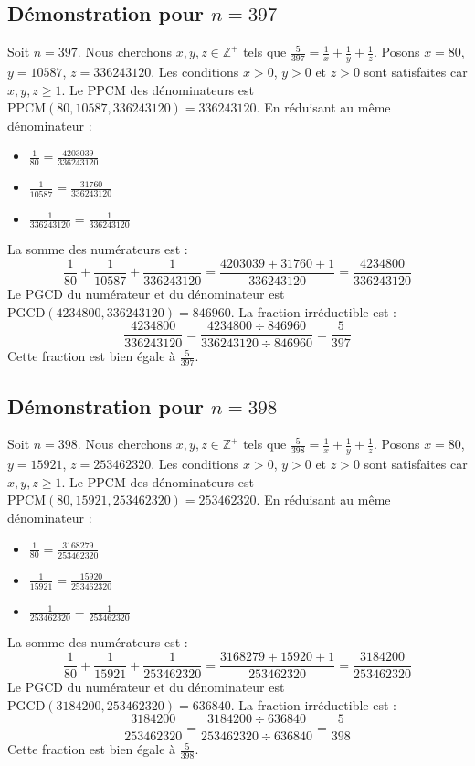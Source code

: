 \documentclass[11pt,a4paper]{article}
\begin{document}
\subsection{Démonstration pour $n = 397$}
Soit $n = 397$. Nous cherchons $x, y, z \in \mathbb{Z}^{+}$ tels que $\frac{5}{397} = \frac{1}{x} + \frac{1}{y} + \frac{1}{z}$.
Posons $x = 80$, $y = 10587$, $z = 336243120$.
Les conditions $x > 0$, $y > 0$ et $z > 0$ sont satisfaites car $x, y, z \geq 1$.
Le PPCM des dénominateurs est $\text{PPCM}(80, 10587, 336243120) = 336243120$.
En réduisant au même dénominateur :
\begin{itemize}
    \item $\frac{1}{80} = \frac{4203039}{336243120}$
    \item $\frac{1}{10587} = \frac{31760}{336243120}$
    \item $\frac{1}{336243120} = \frac{1}{336243120}$
\end{itemize}
La somme des numérateurs est :
$$ \frac{1}{80} + \frac{1}{10587} + \frac{1}{336243120} = \frac{4203039 + 31760 + 1}{336243120} = \frac{4234800}{336243120} $$
Le PGCD du numérateur et du dénominateur est $\text{PGCD}(4234800, 336243120) = 846960$.
La fraction irréductible est :
$$ \frac{4234800}{336243120} = \frac{4234800 \div 846960}{336243120 \div 846960} = \frac{5}{397} $$
Cette fraction est bien égale à $\frac{5}{397}$.

\subsection{Démonstration pour $n = 398$}
Soit $n = 398$. Nous cherchons $x, y, z \in \mathbb{Z}^{+}$ tels que $\frac{5}{398} = \frac{1}{x} + \frac{1}{y} + \frac{1}{z}$.
Posons $x = 80$, $y = 15921$, $z = 253462320$.
Les conditions $x > 0$, $y > 0$ et $z > 0$ sont satisfaites car $x, y, z \geq 1$.
Le PPCM des dénominateurs est $\text{PPCM}(80, 15921, 253462320) = 253462320$.
En réduisant au même dénominateur :
\begin{itemize}
    \item $\frac{1}{80} = \frac{3168279}{253462320}$
    \item $\frac{1}{15921} = \frac{15920}{253462320}$
    \item $\frac{1}{253462320} = \frac{1}{253462320}$
\end{itemize}
La somme des numérateurs est :
$$ \frac{1}{80} + \frac{1}{15921} + \frac{1}{253462320} = \frac{3168279 + 15920 + 1}{253462320} = \frac{3184200}{253462320} $$
Le PGCD du numérateur et du dénominateur est $\text{PGCD}(3184200, 253462320) = 636840$.
La fraction irréductible est :
$$ \frac{3184200}{253462320} = \frac{3184200 \div 636840}{253462320 \div 636840} = \frac{5}{398} $$
Cette fraction est bien égale à $\frac{5}{398}$.
\end{document}
